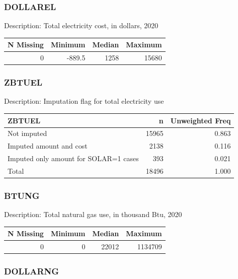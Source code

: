 \documentclass[
]{krantz}
\begin{document}
\hypertarget{dollarel}{%
\subsubsection*{DOLLAREL}\label{dollarel}}


Description: Total electricity cost, in dollars, 2020

\begin{tabular}[t]{r|r|r|r}
\hline
N Missing & Minimum & Median & Maximum\\
\hline
0 & -889.5 & 1258 & 15680\\
\hline
\end{tabular}

\hypertarget{zbtuel}{%
\subsubsection*{ZBTUEL}\label{zbtuel}}


Description: Imputation flag for total electricity use

\begin{tabular}[t]{l|r|r}
\hline
ZBTUEL & n & Unweighted Freq\\
\hline
Not imputed & 15965 & 0.863\\
\hline
Imputed amount and cost & 2138 & 0.116\\
\hline
Imputed only amount for SOLAR=1 cases & 393 & 0.021\\
\hline
Total & 18496 & 1.000\\
\hline
\end{tabular}

\hypertarget{btung}{%
\subsubsection*{BTUNG}\label{btung}}


Description: Total natural gas use, in thousand Btu, 2020

\begin{tabular}[t]{r|r|r|r}
\hline
N Missing & Minimum & Median & Maximum\\
\hline
0 & 0 & 22012 & 1134709\\
\hline
\end{tabular}

\hypertarget{dollarng}{%
\subsubsection*{DOLLARNG}\label{dollarng}}
\end{document}
